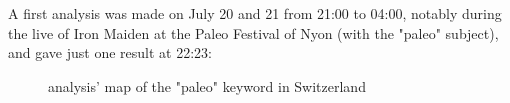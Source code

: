 \documentclass[a4paper,11pt]{report}
\begin{document}
A first analysis was made on July 20 and 21 from 21:00 to 04:00, notably during the live of Iron Maiden at the Paleo Festival of Nyon (with the "paleo" subject), and gave just one result at 22:23:
\begin{figure}[H]
\vspace{-5pt}
\begin{center}
\vspace{-20pt}
\caption{analysis' map of the "paleo" keyword in Switzerland}
\end{center}
\end{figure}
\vspace{-10pt}
\end{document}
